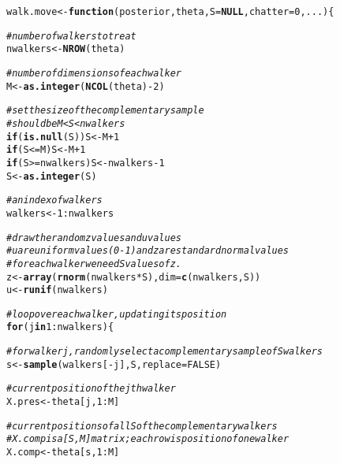 \documentclass{article}\usepackage[]{graphicx}\usepackage[]{color}
\makeatletter
\newcommand{\hlnum}[1]{\textcolor[rgb]{0.686,0.059,0.569}{#1}}%
\newcommand{\hlcom}[1]{\textcolor[rgb]{0.678,0.584,0.686}{\textit{#1}}}%
\newcommand{\hlopt}[1]{\textcolor[rgb]{0,0,0}{#1}}%
\newcommand{\hlstd}[1]{\textcolor[rgb]{0.345,0.345,0.345}{#1}}%
\newcommand{\hlkwa}[1]{\textcolor[rgb]{0.161,0.373,0.58}{\textbf{#1}}}%
\newcommand{\hlkwb}[1]{\textcolor[rgb]{0.69,0.353,0.396}{#1}}%
\newcommand{\hlkwc}[1]{\textcolor[rgb]{0.333,0.667,0.333}{#1}}%
\newcommand{\hlkwd}[1]{\textcolor[rgb]{0.737,0.353,0.396}{\textbf{#1}}}%
\newenvironment{kframe}{%
 \def\at@end@of@kframe{}%
 \ifinner\ifhmode%
  \def\at@end@of@kframe{\end{minipage}}%
  \begin{minipage}{\columnwidth}%
 \fi\fi%
 \def\FrameCommand##1{\hskip\@totalleftmargin \hskip-\fboxsep
 \colorbox{shadecolor}{##1}\hskip-\fboxsep
     \hskip-\linewidth \hskip-\@totalleftmargin \hskip\columnwidth}%
 \MakeFramed {\advance\hsize-\width
   \@totalleftmargin\z@ \linewidth\hsize
   \@setminipage}}%
 {\par\unskip\endMakeFramed%
 \at@end@of@kframe}
\newenvironment{knitrout}{}{} %
\makeatother
\begin{document}
\begin{knitrout}
\color{fgcolor}\begin{kframe}
\begin{alltt}
\hlstd{walk.move} \hlkwb{<-} \hlkwa{function}\hlstd{(}\hlkwc{posterior}\hlstd{,} \hlkwc{theta}\hlstd{,} \hlkwc{S}\hlstd{=}\hlkwa{NULL}\hlstd{,} \hlkwc{chatter}\hlstd{=}\hlnum{0}\hlstd{,} \hlkwc{...}\hlstd{) \{}

  \hlcom{# number of walkers to treat}
  \hlstd{nwalkers} \hlkwb{<-} \hlkwd{NROW}\hlstd{(theta)}

  \hlcom{# number of dimensions of each walker}
  \hlstd{M} \hlkwb{<-} \hlkwd{as.integer}\hlstd{(} \hlkwd{NCOL}\hlstd{(theta)}\hlopt{-}\hlnum{2} \hlstd{)}

  \hlcom{# set the size of the complementary sample}
  \hlcom{# should be M < S < nwalkers}
  \hlkwa{if} \hlstd{(}\hlkwd{is.null}\hlstd{(S)) S} \hlkwb{<-} \hlstd{M}\hlopt{+}\hlnum{1}
  \hlkwa{if} \hlstd{(S} \hlopt{<=} \hlstd{M) S} \hlkwb{<-} \hlstd{M}\hlopt{+}\hlnum{1}
  \hlkwa{if} \hlstd{(S} \hlopt{>=} \hlstd{nwalkers) S} \hlkwb{<-} \hlstd{nwalkers} \hlopt{-} \hlnum{1}
  \hlstd{S} \hlkwb{<-} \hlkwd{as.integer}\hlstd{(S)}

  \hlcom{# an index of walkers}
  \hlstd{walkers} \hlkwb{<-} \hlnum{1}\hlopt{:}\hlstd{nwalkers}

  \hlcom{# draw the random z values and u values}
  \hlcom{# u are uniform values (0-1) and z are standard normal values}
  \hlcom{# for each walker we need S values of z.}
  \hlstd{z} \hlkwb{<-} \hlkwd{array}\hlstd{(}\hlkwd{rnorm}\hlstd{(nwalkers} \hlopt{*} \hlstd{S),} \hlkwc{dim}\hlstd{=}\hlkwd{c}\hlstd{(nwalkers, S))}
  \hlstd{u} \hlkwb{<-} \hlkwd{runif}\hlstd{(nwalkers)}

  \hlcom{# loop over each walker, updating its position}
  \hlkwa{for} \hlstd{(j} \hlkwa{in} \hlnum{1}\hlopt{:}\hlstd{nwalkers) \{}

    \hlcom{# for walker j, randomly select a complementary sample of S walkers}
    \hlstd{s} \hlkwb{<-} \hlkwd{sample}\hlstd{(walkers[}\hlopt{-}\hlstd{j], S,} \hlkwc{replace}\hlstd{=}\hlnum{FALSE}\hlstd{)}

    \hlcom{# current position of the jth walker}
    \hlstd{X.pres} \hlkwb{<-} \hlstd{theta[j,} \hlnum{1}\hlopt{:}\hlstd{M]}

    \hlcom{# current positions of all S of the complementary walkers}
    \hlcom{# X.comp is a [S, M] matrix; each row is position of one walker}
    \hlstd{X.comp} \hlkwb{<-} \hlstd{theta[s,} \hlnum{1}\hlopt{:}\hlstd{M]}


\end{alltt}
\end{kframe}
\end{knitrout}
\end{document}
